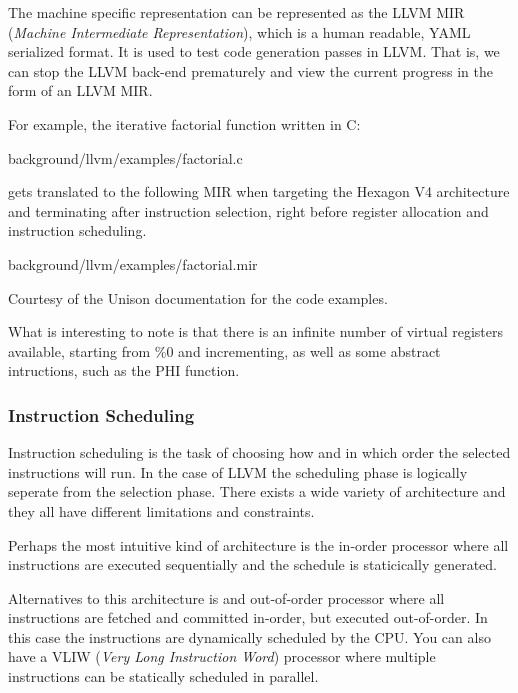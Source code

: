 The machine specific representation can be represented as the LLVM MIR (\textit{Machine
Intermediate Representation}), which is a human readable, YAML serialized format. It is
used to test code generation passes in LLVM. That is, we can stop the LLVM back-end
prematurely and view the current progress in the form of an LLVM MIR.

For example, the iterative factorial function written in C:


{background/llvm/examples/factorial.c}

gets translated to the following MIR when targeting the Hexagon V4 architecture and
terminating after instruction selection, right before register allocation and instruction
scheduling.


{background/llvm/examples/factorial.mir}

Courtesy of the Unison documentation for the code examples.

What is interesting to note is that there is an infinite number of virtual registers available,
starting from \%0 and incrementing, as well as some abstract intructions, such as the PHI
function.

\subsubsection{Instruction Scheduling}
Instruction scheduling is the task of choosing how and in which order the selected instructions
will run. In the case of LLVM the scheduling phase is logically seperate from the selection
phase. There exists a wide variety of architecture and they all have different limitations
and constraints.

Perhaps the most intuitive kind of architecture is the in-order processor where all
instructions are executed sequentially and the schedule is staticically generated.

Alternatives to this architecture is and out-of-order processor where all instructions are
fetched and committed in-order, but executed out-of-order. In this case the instructions
are dynamically scheduled by the CPU. You can also have a VLIW (\textit{Very Long Instruction
Word}) processor where multiple instructions can be statically scheduled in parallel.

